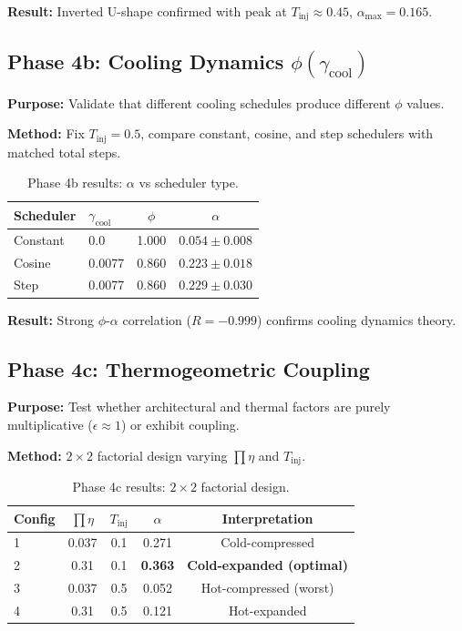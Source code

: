 \documentclass[11pt, a4paper]{article}
\theoremstyle{definition}
\begin{document}
\textbf{Result:} Inverted U-shape confirmed with peak at $T_{\text{inj}} \approx 0.45$, $\alpha_{\text{max}} = 0.165$.

\subsection{Phase 4b: Cooling Dynamics $\phi(\gamma_{\text{cool}})$}
\label{sec:phase4b}

\textbf{Purpose:} Validate that different cooling schedules produce different $\phi$ values.

\textbf{Method:} Fix $T_{\text{inj}} = 0.5$, compare constant, cosine, and step schedulers with matched total steps.

\begin{table}[htbp]
\centering
\caption{Phase 4b results: $\alpha$ vs scheduler type.}
\label{tab:phase4b_results}
\begin{tabular}{@{}llcc@{}}
\toprule
\textbf{Scheduler} & $\gamma_{\text{cool}}$ & $\phi$ & $\alpha$ \\
\midrule
Constant & 0.0 & 1.000 & $0.054 \pm 0.008$ \\
Cosine & 0.0077 & 0.860 & $0.223 \pm 0.018$ \\
Step & 0.0077 & 0.860 & $0.229 \pm 0.030$ \\
\bottomrule
\end{tabular}
\end{table}

\textbf{Result:} Strong $\phi$-$\alpha$ correlation ($R = -0.999$) confirms cooling dynamics theory.

\subsection{Phase 4c: Thermogeometric Coupling}
\label{sec:phase4c}

\textbf{Purpose:} Test whether architectural and thermal factors are purely multiplicative ($\epsilon \approx 1$) or exhibit coupling.

\textbf{Method:} $2 \times 2$ factorial design varying $\prod\eta$ and $T_{\text{inj}}$.

\begin{table}[htbp]
\centering
\caption{Phase 4c results: $2\times2$ factorial design.}
\label{tab:phase4c_results}
\begin{tabular}{@{}lcccc@{}}
\toprule
\textbf{Config} & $\prod\eta$ & $T_{\text{inj}}$ & $\alpha$ & \textbf{Interpretation} \\
\midrule
1 & 0.037 & 0.1 & 0.271 & Cold-compressed \\
2 & 0.31 & 0.1 & \textbf{0.363} & \textbf{Cold-expanded (optimal)} \\
3 & 0.037 & 0.5 & 0.052 & Hot-compressed (worst) \\
4 & 0.31 & 0.5 & 0.121 & Hot-expanded \\
\bottomrule
\end{tabular}
\end{table}
\end{document}
